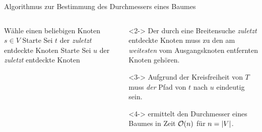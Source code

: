 \begin{frame}{Algorithmus zur Bestimmung des Durchmessers eines Baumes}
\begin{columns}[T]
\begin{column}{0.5\textwidth}
\vspace{-6pt}
\begin{algorithm}[H]
	\caption{Durchmesser eines Baumes}
	\label{trees:alg:diameter}
	\DontPrintSemicolon
    W\"ahle einen beliebigen Knoten $s \in V$\;
	Starte \;
	Sei $t$ der \emph{zuletzt} entdeckte Knoten\;
	\BlankLine
    Starte \;
	Sei $u$ der \emph{zuletzt} entdeckte Knoten\;
	\BlankLine
\end{algorithm}
\end{column}
\begin{column}{0.47\textwidth}
\vspace{-6pt}
\begin{remark}<2->
Der durch eine Breitensuche \emph{zuletzt} entdeckte Knoten muss zu den am \emph{weitesten} vom Ausgangsknoten entfernten Knoten geh\"oren.
\end{remark}

\begin{remark}<3->
Aufgrund der Kreisfreiheit von $T$ muss \emph{der} Pfad von $t$ nach $u$ eindeutig sein.
\end{remark}

\begin{theorem}<4->
\label{trees:thm:diameter}
\vspace*{-7pt}
 ermittelt den Durchmesser eines Baumes in Zeit $\mathcal{O}(n)$ f\"ur $n = \vert V\vert$.
\end{theorem}
\end{column}
\end{columns}
\end{frame}


